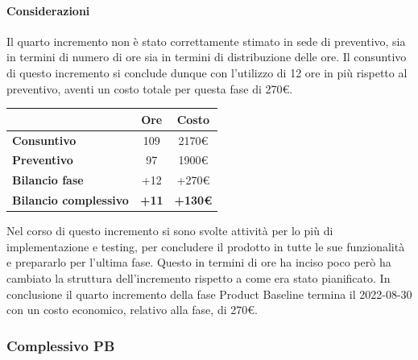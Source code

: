 \paragraph{Considerazioni} \hfill \break
Il quarto incremento non è stato correttamente stimato in sede di preventivo, sia in termini di numero di ore sia 
in termini di distribuzione delle ore. Il consuntivo di questo incremento si conclude dunque con l'utilizzo di 12 ore in più rispetto al preventivo, aventi un costo totale per questa fase di 270\euro.
\begin{center}
	\renewcommand{\arraystretch}{1.8}
	\begin{tabular}{ | l |c|c| }
    \hline
    & \textbf{Ore} & \textbf{Costo} \\
	\hline
    \textbf{Consuntivo} & 109 & 2170\euro \\
    \hline
    \textbf{Preventivo} & 97 & 1900\euro \\
    \hline
    \textbf{Bilancio fase} & +12 & +270\euro \\
    \hline
    \textbf{Bilancio complessivo} & \textbf{+11} & \textbf{+130\euro} \\
    \hline
    \end{tabular}
\end{center}
Nel corso di questo incremento si sono svolte attività per lo più di implementazione e testing, per concludere il prodotto in tutte le sue funzionalità e prepararlo per l'ultima fase. Questo in termini di ore ha inciso poco però ha cambiato la struttura dell'incremento rispetto a come era stato pianificato.
In conclusione il quarto incremento della fase Product Baseline termina il 2022-08-30 con un costo economico, relativo alla fase, di 270\euro.

\subsubsection{Complessivo PB}

